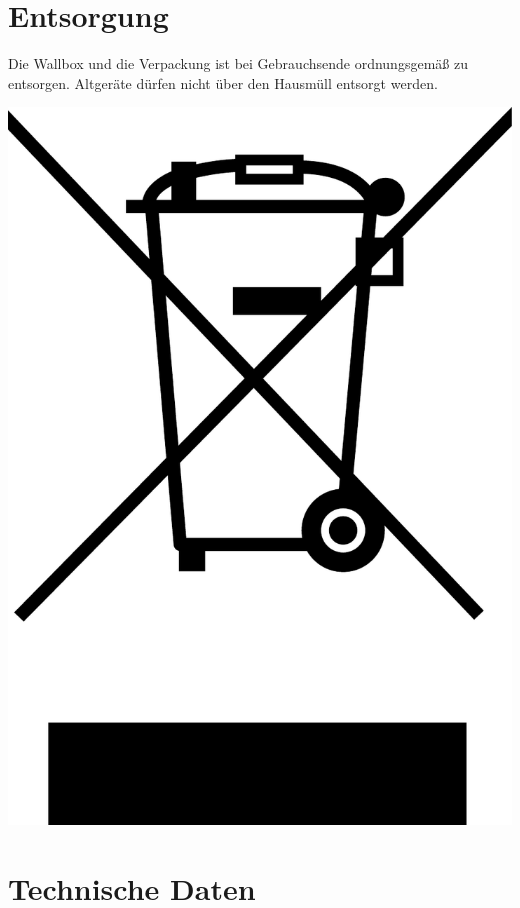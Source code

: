 \documentclass[a4paper,10pt]{article}
\begin{document}
\begin{multicols*}{2}
	\section{Entsorgung}
	\begin{minipage}{0.35\textwidth}
		Die Wallbox und die Verpackung ist bei Gebrauchsende ordnungsgemäß zu
		entsorgen. Altgeräte dürfen nicht über den Hausmüll entsorgt werden.
	\end{minipage}\hfill
	\begin{minipage}{0.1\textwidth}
		\includegraphics[width=\linewidth]{./img_warp2/resized/weee.pdf}
	\end{minipage}

	\section{Technische Daten}


\end{multicols*}
\end{document}
